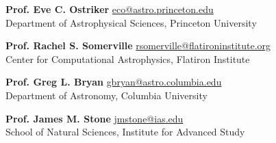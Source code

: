 \documentclass[12pt]{article}
\begin{document}


{\small {\bf Prof. Eve C. Ostriker}
\url{eco@astro.princeton.edu}\\
Department of Astrophysical Sciences, Princeton University}


{\small {\bf Prof. Rachel S. Somerville}
\url{rsomerville@flatironinstitute.org}\\
Center for Computational Astrophysics, Flatiron Institute}


{\small {\bf Prof. Greg L. Bryan}
\url{gbryan@astro.columbia.edu}\\
Department of Astronomy, Columbia University}


{\small {\bf Prof. James M. Stone}
\url{jmstone@ias.edu}\\
School of Natural Sciences, Institute for Advanced Study}
\end{document}
